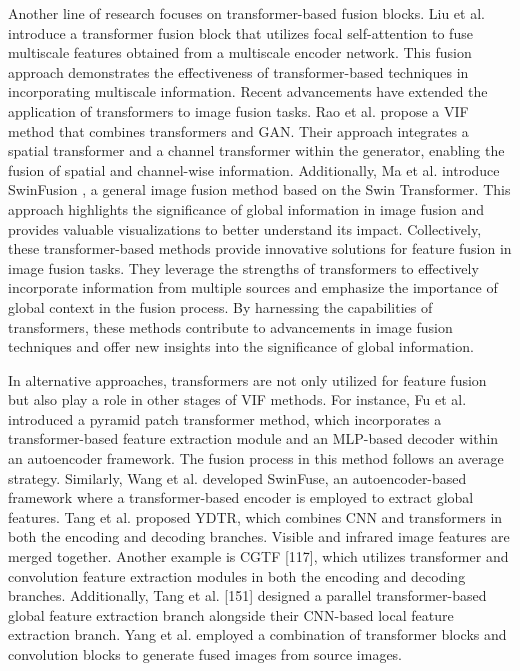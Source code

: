 Another line of research focuses on transformer-based fusion blocks. Liu et al. \cite{liu2022mfst} introduce a transformer fusion block that utilizes focal self-attention to fuse multiscale features obtained from a multiscale encoder network. This fusion approach demonstrates the effectiveness of transformer-based techniques in incorporating multiscale information. Recent advancements have extended the application of transformers to image fusion tasks. Rao et al. \cite{rao2023tgfuse} propose a VIF method that combines transformers and GAN. Their approach integrates a spatial transformer and a channel transformer within the generator, enabling the fusion of spatial and channel-wise information. Additionally, Ma et al. introduce SwinFusion \cite{ma2022swinfusion}, a general image fusion method based on the Swin Transformer. This approach highlights the significance of global information in image fusion and provides valuable visualizations to better understand its impact. Collectively, these transformer-based methods provide innovative solutions for feature fusion in image fusion tasks. They leverage the strengths of transformers to effectively incorporate information from multiple sources and emphasize the importance of global context in the fusion process. By harnessing the capabilities of transformers, these methods contribute to advancements in image fusion techniques and offer new insights into the significance of global information.


In alternative approaches, transformers are not only utilized for feature fusion but also play a role in other stages of VIF methods. For instance, Fu et al.\cite{fu2021ppt} introduced a pyramid patch transformer method, which incorporates a transformer-based feature extraction module and an MLP-based decoder within an autoencoder framework. The fusion process in this method follows an average strategy. Similarly, Wang et al. \cite{wang2022swinfuse} developed SwinFuse, an autoencoder-based framework where a transformer-based encoder is employed to extract global features. Tang et al. \cite{tang2022ydtr} proposed YDTR, which combines CNN and transformers in both the encoding and decoding branches. Visible and infrared image features are merged together. Another example is CGTF [117], which utilizes transformer and convolution feature extraction modules in both the encoding and decoding branches. Additionally, Tang et al. [151] designed a parallel transformer-based global feature extraction branch alongside their CNN-based local feature extraction branch. Yang et al. \cite{yang2023dglt} employed a combination of transformer blocks and convolution blocks to generate fused images from source images.

